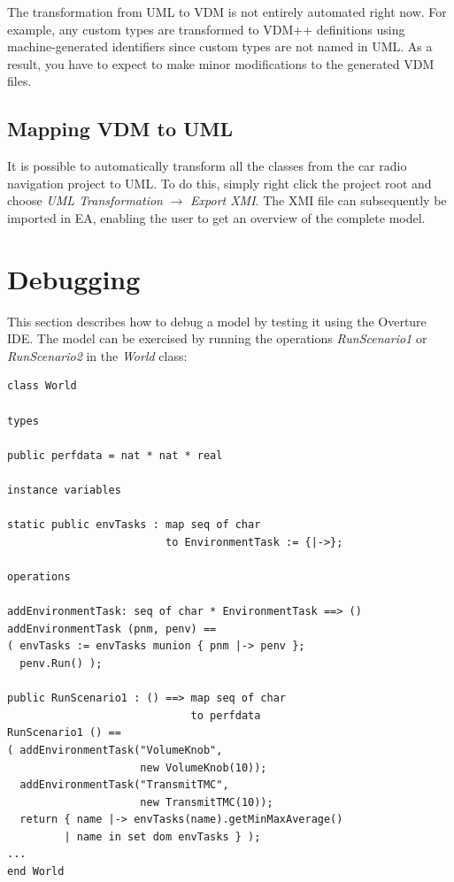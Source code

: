 
The transformation from UML to VDM is not entirely automated right now. For
example, any custom types are transformed to VDM++ definitions using
machine-generated identifiers since custom types are not named in
UML. As a result, you have to expect to make minor modifications to
the generated VDM files. 

\subsection{Mapping VDM to UML}

It is possible to automatically transform all the classes from the car
radio navigation project to UML. To do this, simply right
click the project root and choose \emph{UML Transformation} $
\rightarrow $ \emph{Export XMI}. The XMI file can subsequently be
imported in EA, enabling the user to get an overview
of the complete model.

\section{Debugging}\label{sec:debugging}

This section describes how to debug a model by testing it using the
Overture IDE. The model can be exercised by running the operations
\emph{RunScenario1} or \emph{RunScenario2} in the \emph{World} class:

\begin{lstlisting}
class World

types
  
public perfdata = nat * nat * real

instance variables

static public envTasks : map seq of char 
                         to EnvironmentTask := {|->};

operations

addEnvironmentTask: seq of char * EnvironmentTask ==> ()
addEnvironmentTask (pnm, penv) ==
( envTasks := envTasks munion { pnm |-> penv };
  penv.Run() );

public RunScenario1 : () ==> map seq of char 
                             to perfdata
RunScenario1 () ==
( addEnvironmentTask("VolumeKnob", 
                     new VolumeKnob(10));
  addEnvironmentTask("TransmitTMC", 
                     new TransmitTMC(10));
  return { name |-> envTasks(name).getMinMaxAverage() 
         | name in set dom envTasks } );
...
end World
\end{lstlisting}

